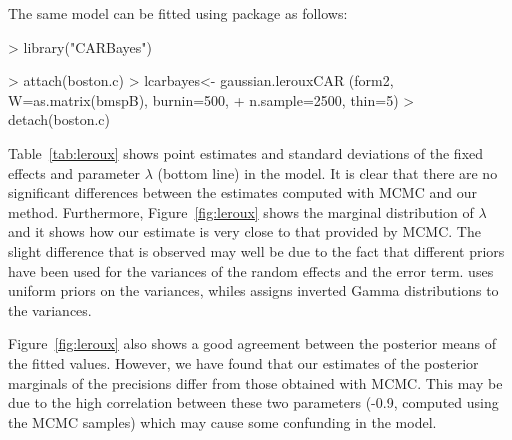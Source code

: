 \documentclass[article]{jss}
\begin{document}
The same model can be fitted using package \citep{CARBayes:2013}
as follows:

\begin{Schunk}
\begin{Sinput}
> library("CARBayes")
\end{Sinput}
\end{Schunk}
\begin{Schunk}
\begin{Sinput}
> attach(boston.c)
> lcarbayes<- gaussian.lerouxCAR (form2, W=as.matrix(bmspB), burnin=500, 
+    n.sample=2500, thin=5)
> detach(boston.c)
\end{Sinput}
\end{Schunk}


Table~\ref{tab:leroux} shows point estimates and standard deviations of the
fixed effects and parameter $\lambda$ (bottom line) in the model. It is clear
that there are no significant differences between the estimates computed with
MCMC and our method.  Furthermore, Figure~\ref{fig:leroux} shows the marginal
distribution of $\lambda$ and it shows how our estimate is very close to that
provided by MCMC. The slight difference that is observed may well be due to the
fact that different priors have been used for the variances of the random
effects and the error term.  uses uniform priors on the variances,
whiles  assigns inverted Gamma distributions to the variances.

Figure~\ref{fig:leroux} also shows a good agreement between the posterior
means of the fitted values. However, we have found that our estimates
of the posterior marginals of the precisions differ from those obtained
with MCMC. This may be due to the high correlation between these two parameters
(-0.9, computed using the MCMC samples) which may cause some confunding in the
model.
\end{document}
